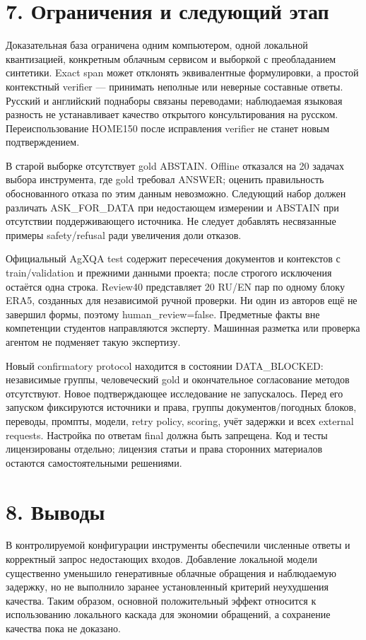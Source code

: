 \documentclass[14pt,a4paper]{extarticle}
\begin{document}
\section*{7. Ограничения и следующий этап}

Доказательная база ограничена одним компьютером, одной локальной квантизацией, конкретным облачным сервисом и выборкой с преобладанием синтетики. Exact span может отклонять эквивалентные формулировки, а простой контекстный verifier --- принимать неполные или неверные составные ответы. Русский и английский поднаборы связаны переводами; наблюдаемая языковая разность не устанавливает качество открытого консультирования на русском. Переиспользование HOME150 после исправления verifier не станет новым подтверждением.


В старой выборке отсутствует gold ABSTAIN. Offline отказался на 20 задачах выбора инструмента, где gold требовал ANSWER; оценить правильность обоснованного отказа по этим данным невозможно. Следующий набор должен различать ASK\_FOR\_DATA при недостающем измерении и ABSTAIN при отсутствии поддерживающего источника. Не следует добавлять несвязанные примеры safety/refusal ради увеличения доли отказов.


Официальный AgXQA test содержит пересечения документов и контекстов с train/validation и прежними данными проекта; после строгого исключения остаётся одна строка. Review40 представляет 20 RU/EN пар по одному блоку ERA5, созданных для независимой ручной проверки. Ни один из авторов ещё не завершил формы, поэтому human\_review=false. Предметные факты вне компетенции студентов направляются эксперту. Машинная разметка или проверка агентом не подменяет такую экспертизу.


Новый confirmatory protocol находится в состоянии DATA\_BLOCKED: независимые группы, человеческий gold и окончательное согласование методов отсутствуют. Новое подтверждающее исследование не запускалось. Перед его запуском фиксируются источники и права, группы документов/погодных блоков, переводы, промпты, модели, retry policy, scoring, учёт задержки и всех external requests. Настройка по ответам final должна быть запрещена. Код и тесты лицензированы отдельно; лицензия статьи и права сторонних материалов остаются самостоятельными решениями.


\section*{8. Выводы}

В контролируемой конфигурации инструменты обеспечили численные ответы и корректный запрос недостающих входов. Добавление локальной модели существенно уменьшило генеративные облачные обращения и наблюдаемую задержку, но не выполнило заранее установленный критерий неухудшения качества. Таким образом, основной положительный эффект относится к использованию локального каскада для экономии обращений, а сохранение качества пока не доказано.
\end{document}
